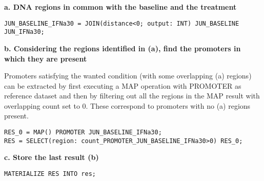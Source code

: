 \documentclass[12pt, a4paper]{article}
\begin{document}
\textbf{a. DNA regions in common with the baseline and the treatment}

\begin{verbatim}
JUN_BASELINE_IFNa30 = JOIN(distance<0; output: INT) JUN_BASELINE JUN_IFNa30;
\end{verbatim}

\textbf{b. Considering the regions identified in (a), find the promoters in which they are present}

Promoters satisfying the wanted condition (with some overlapping (a) regions) can be extracted by first executing a MAP operation with PROMOTER as reference dataset and then by filtering out all the regions in the MAP result with overlapping count set to 0. These correspond to promoters with no (a) regions present.

\begin{verbatim}
RES_0 = MAP() PROMOTER JUN_BASELINE_IFNa30;
RES = SELECT(region: count_PROMOTER_JUN_BASELINE_IFNa30>0) RES_0;
\end{verbatim}

\textbf{c. Store the last result (b)}

\begin{verbatim}
MATERIALIZE RES INTO res;
\end{verbatim}
\end{document}
